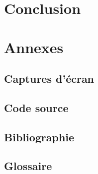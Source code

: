 \documentclass[a4paper,french,12pt]{article}
\begin{document}
\section{Conclusion}



\section{Annexes}
	
	\subsection{Captures d'écran}
		\newpage
	
	\subsection{Code source}
	
	
	\subsection{Bibliographie}
	

		
	\subsection{Glossaire}
		
\end{document}
